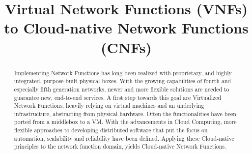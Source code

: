 \documentclass[conference, a4paper]{IEEEtran}
\begin{document}
%
\title{Virtual Network Functions (VNFs) to Cloud-native Network Functions (CNFs)}

\author{
}

\maketitle

\begin{abstract}
Implementing Network Functions has long been realized with proprietary, and highly integrated, purpose-built physical boxes. With the growing capabilities of fourth and especially fifth generation networks, newer and more flexible solutions are needed to guarantee new, end-to-end services. A first step towards this goal are Virtualized Network Functions, heavily relying on virtual machines and an underlying infrastructure, abstracting from physical hardware. Often the functionalities have been ported from a middlebox to a VM. With the advancements in Cloud Computing, more flexible approaches to developing distributed software that put the focus on automation, scalability and reliability have been defined. Applying these Cloud-native principles to the network function domain, yields Cloud-native Network Functions.
\end{abstract}

\IEEEpeerreviewmaketitle








\newpage
\tableofcontents

\end{document}
